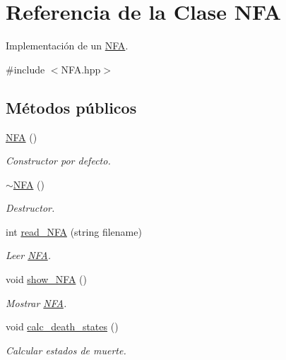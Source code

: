 \hypertarget{class_n_f_a}{}\section{Referencia de la Clase N\+FA}
\label{class_n_f_a}


Implementación de un \mbox{\hyperlink{class_n_f_a}{N\+FA}}.  




{\ttfamily \#include $<$N\+F\+A.\+hpp$>$}

\subsection*{Métodos públicos}
\begin{DoxyCompactItemize}
\item 
\mbox{\label{class_n_f_a_a6a4e79c90998ebb75e7b6ce280b14bed}} 
\mbox{\hyperlink{class_n_f_a_a6a4e79c90998ebb75e7b6ce280b14bed}{N\+FA}} ()
\begin{DoxyCompactList}\small\item\em Constructor por defecto. \end{DoxyCompactList}\item 
\mbox{\label{class_n_f_a_a48f9c98fbfd76cd5bb89a71a9bb006f9}} 
\mbox{\hyperlink{class_n_f_a_a48f9c98fbfd76cd5bb89a71a9bb006f9}{$\sim$\+N\+FA}} ()
\begin{DoxyCompactList}\small\item\em Destructor. \end{DoxyCompactList}\item 
int \mbox{\hyperlink{class_n_f_a_a694ab54b829fb1d45ec8bb752a0c31a0}{read\+\_\+\+N\+FA}} (string filename)
\begin{DoxyCompactList}\small\item\em Leer \mbox{\hyperlink{class_n_f_a}{N\+FA}}. \end{DoxyCompactList}\item 
void \mbox{\hyperlink{class_n_f_a_a53a6b0ddcfb706dc4725cf2a6a8f2388}{show\+\_\+\+N\+FA}} ()
\begin{DoxyCompactList}\small\item\em Mostrar \mbox{\hyperlink{class_n_f_a}{N\+FA}}. \end{DoxyCompactList}\item 
void \mbox{\hyperlink{class_n_f_a_a6a32ddeb3c446ff0f31f09f3d04b1582}{calc\+\_\+death\+\_\+states}} ()
\begin{DoxyCompactList}\small\item\em Calcular estados de muerte. \end{DoxyCompactList}\item 

\end{DoxyCompactItemize}
